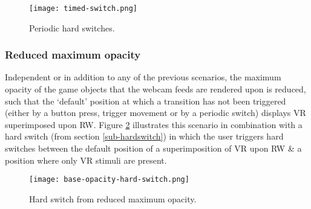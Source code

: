 \begin{figure}[h]
	\begin{center}
		\texttt{[image: timed-switch.png]}
		\caption{Periodic hard switches.}
		\label{scenariotimed}
	\end{center}
\end{figure}


\subsubsection{Reduced maximum opacity}
\label{subsub-baseopacity}
Independent or in addition to any of the previous scenarios, the maximum opacity of the game objects that the webcam feeds are rendered upon is reduced, such that the `default' position at which a transition has not been triggered (either by a button press, trigger movement or by a periodic switch) displays VR superimposed upon RW. Figure \ref{scenariobaseopacity} illustrates this scenario in combination with a hard switch (from section \ref{sub-hardswitch}) in which the user triggers hard switches between the default position of a superimposition of VR upon RW \& a position where only VR stimuli are present.

\begin{figure}[h]
	\begin{center}
		\texttt{[image: base-opacity-hard-switch.png]}
		\caption{Hard switch from reduced maximum opacity.}
		\label{scenariobaseopacity}
	\end{center}
\end{figure}
























